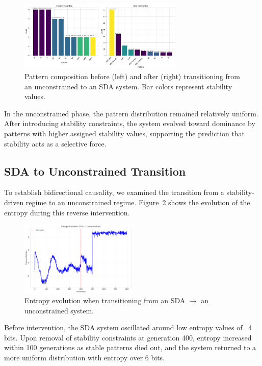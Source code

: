 \documentclass[preprint,12pt]{elsarticle}
\begin{document}
\begin{figure}[h]
    \centering
    \includegraphics[width=0.7\textwidth]{figure_7.png}
    \caption{Pattern composition before (left) and after (right) transitioning from an unconstrained to an SDA system. Bar colors represent stability values.}
    \label{fig:u2s-patterns}
\end{figure}

In the unconstrained phase, the pattern distribution remained relatively uniform. After introducing stability constraints, the system evolved toward dominance by patterns with higher assigned stability values, supporting the prediction that stability acts as a selective force.

\subsection{SDA to Unconstrained Transition}

To establish bidirectional causality, we examined the transition from a stability-driven regime to an unconstrained regime. Figure~\ref{fig:s2u-entropy} shows the evolution of the entropy during this reverse intervention.

\begin{figure}[h]
    \centering
    \includegraphics[width=0.5\textwidth]{figure_8.png}
    \caption{Entropy evolution when transitioning from an SDA $\to$ an unconstrained system.}
    \label{fig:s2u-entropy}
\end{figure}

Before intervention, the SDA system oscillated around low entropy values of ~4 bits. Upon removal of stability constraints at generation 400, entropy increased within 100 generations as stable patterns died out, and the system returned to a more uniform distribution with entropy over 6 bits.
\end{document}
